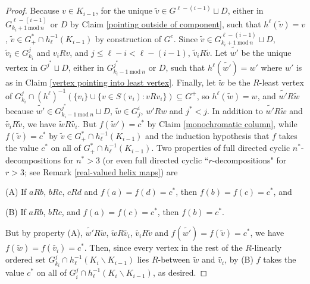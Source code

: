 \documentclass{amsart}
\theoremstyle{definition}
\theoremstyle{remark}
\numberwithin{equation}{section}
\begin{document}
\begin{proof}
Because $v \in K_{i-1}$, for the unique $\tilde{v} \in G^{\ell-(i-1)}\sqcup D$, either in $G^{\ell-(i-1)}_{k_{i}+1 \mathrm{\:mod\:} n}$ or $D$ by Claim \ref{pointing outside of component}, such that $h^{\ell}(\tilde{v}) = v$, $\tilde{v} \in G^{*}_{+} \cap h^{-1}_{\ell}(K_{i-1})$ by construction of $G^{c}$. Since $\tilde{v} \in G^{\ell-(i-1)}_{k_{i}+1 \mathrm{\:mod\:} n} \sqcup D$, $\tilde{v}_{i} \in G_{k_{i}}^{j}$ and $v_{i} R v$, and $j \leq \ell - i < \ell-(i-1)$, $\tilde{v}_{i} R \tilde{v}$. Let $\tilde{w'}$ be the unique vertex in  $G^{j^{*}} \sqcup D$, either in $G^{j^{*}}_{k_{i}-1 \mathrm{\:mod\:} n}$ or $D$, such that $h^{\ell}(\tilde{w'})= w'$ where $w'$ is as in Claim \ref{vertex pointing into least vertex}. Finally, let $\tilde{w}$ be the $R$-least vertex of $G_{k_{i}}^{j} \cap (h^{\ell})^{-1}(\{v_{i}\} \cup \{v\in S(v_{i}): vRv_{i}\}) \subseteq G^{+}$, so $h^{\ell}(\tilde{w}) = w$, and $\tilde{w'} R \tilde{w}$ because $\tilde{w'} \in G^{j^{*}}_{k_{i}-1 \mathrm{\:mod\:} n} \sqcup D$, $\tilde{w} \in G_{j}^{i}$, $w' R w$ and $j^{*} < j$. In addition to $\tilde{w'} R \tilde{w}$ and $\tilde{v_{i}} R \tilde{v}$, we have $\tilde{w}R \tilde{v_{i}}$. But $f(\tilde{w}')= c^{*}$ by Claim \ref{monochromatic column}, while $f(\tilde{v}) = c^{*}$ by $\tilde{v} \in G^{*}_{+} \cap h^{-1}_{\ell}(K_{i-1})$ and the induction hypothesis that $f$ takes the value $c^{*}$ on all of $G^{*}_{+} \cap h^{-1}_{\ell}(K_{i-1})$. Two properties of full directed cyclic $n^{*}$-decompositions for $n^{*} > 3$ (or even full directed cyclic ``$r$-decompositions" for $r > 3$; see Remark \ref{real-valued helix maps}) are

(A) If $aRb$, $bRc$, $cRd$ and $f(a) = f(d) = c^{*}$, then $f(b)=f(c) = c^{*}$, and

(B) If $aRb$, $bRc$, and $f(a) = f(c) = c^{*}$, then $f(b) = c^{*}$.

But by property (A), $\tilde{w'} R \tilde{w}$, $\tilde{w}R \tilde{v_{i}}$, $\tilde{v_{i}} R \tilde{v}$ and $f(\tilde{w'}) =f(\tilde{v}) = c^{*}$, we have $f(\tilde{w})=f(\tilde{v_{i}}) = c^{*}$. Then, since every vertex in the rest of the $R$-linearly ordered set $G_{k_{i}}^{j} \cap h^{-1}_{\ell}(K_{i} \backslash K_{i-1})$ lies $R$-between $\tilde{w}$ and $\tilde{v_{i}}$, by (B) $f$ takes the value $c^{*}$ on all of $G_{i}^{j} \cap h^{-1}_{\ell}(K_{i} \backslash K_{i-1})$, as desired.


\end{proof}
\end{document}
